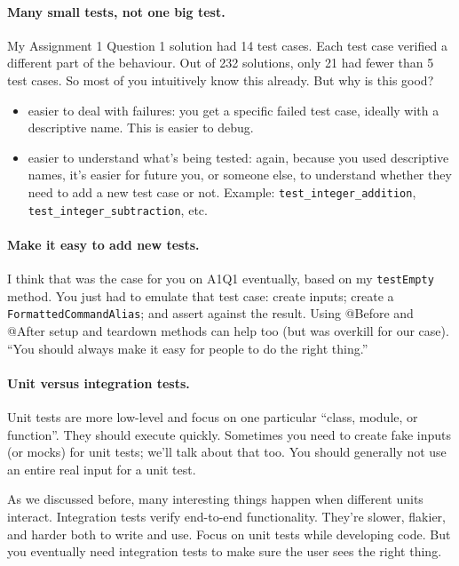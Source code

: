 \documentclass[11pt]{article}
\begin{document}
\paragraph{Many small tests, not one big test.} My Assignment 1 Question 1 solution had 14 test cases.
Each test case verified a different part of the behaviour. Out of 232 solutions, only 21 had fewer
than 5 test cases. So most of you intuitively know this already. But why is this good?

\begin{itemize}
\item easier to deal with failures: you get a specific failed test case, ideally with a descriptive name.
This is easier to debug.
\item easier to understand what's being tested: again, because you used descriptive names, it's easier
for future you, or someone else, to understand whether they need to add a new test case or not.
Example: {\tt test\_integer\_addition}, {\tt test\_integer\_subtraction}, etc.
\end{itemize}

\paragraph{Make it easy to add new tests.} I think that was the case for you on A1Q1 eventually,
based on my {\tt testEmpty} method. You just had to emulate that test
case: create inputs; create a {\tt FormattedCommandAlias}; and assert
against the result. Using @Before and @After setup and teardown
methods can help too (but was overkill for our case). ``You should
always make it easy for people to do the right thing.''

\paragraph{Unit versus integration tests.} Unit tests are more low-level and focus on 
one particular ``class, module, or function''. They should execute quickly. Sometimes you 
need to create fake inputs (or mocks) for unit tests; we'll talk about that too. You should generally
not use an entire real input for a unit test.

As we discussed before, many interesting things happen when different units interact.
Integration tests verify end-to-end functionality. They're slower, flakier, and harder both
to write and use. Focus on unit tests while developing code. But you eventually need
integration tests to make sure the user sees the right thing.
\end{document}
